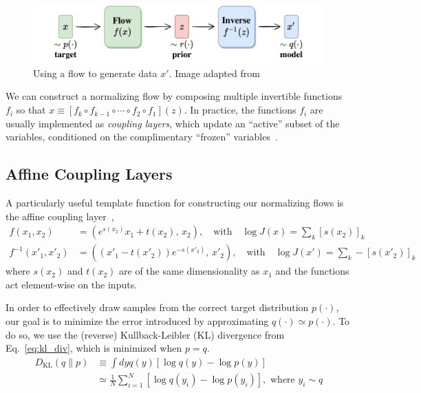 \documentclass[a4paper,11pt]{article}
\begin{document}
\begin{figure}[htpb]
    \centering
    \includegraphics[width=\textwidth]{assets/flow_model.pdf}
    \caption{\label{fig:flow_model} Using a flow to generate data \(x'\). Image
    adapted from~\cite{weng2018flow}}
\end{figure}
%
We can construct a normalizing flow by composing multiple invertible functions
\(f_{i}\) so that \(x\equiv \left[f_{k}\circ f_{k-1}\circ \cdots \circ
f_{2}\circ f_{1}\right](z)\).
%
In practice, the functions \(f_{i}\) are usually implemented as \emph{coupling
layers}, which update an ``active'' subset of the variables, conditioned on the
complimentary ``frozen'' variables~\cite{Kanwar:2020xzo,Albergo:2021vyo}.
%
\subsection{\label{subsec:coupling_layers}Affine Coupling Layers}
A particularly useful template function for constructing our normalizing flows
is the affine coupling layer~\cite{DinhSB16,rezende2015variational},
%
\begin{align*}
    f(x_{1}, x_{2}) &= \left(e^{s(x_2)}x_{1} + t(x_{2}),\, x_{2}\right),
        \quad\text{with}\quad \log J(x) = \sum_{k}\left[s(x_{2})\right]_{k}\\
    f^{-1}(x'_{1}, x'_{2}) &= \left((x'_{1}-t(x'_{2}))e^{-s(x'_{2})},\, x'_{2}\right),
        \quad\text{with}\quad \log J(x') = \sum_{k}-\left[s(x'_{2})\right]_{k}
\end{align*}
%
where \(s(x_{2})\) and \(t(x_{2})\) are of the same dimensionality as \(x_{1}\)
and the functions act element-wise on the inputs.

In order to effectively draw samples from the correct target distribution
\(p(\cdot)\), our goal is to minimize the error introduced by approximating
\(q(\cdot)\simeq p(\cdot)\).
%
To do so, we use the (reverse) Kullback-Leibler (KL) divergence from
Eq.~\ref{eq:kl_div}, which is minimized when \(p=q\).
%
\begin{align}
    \label{eq:kl_div}
    D_{\mathrm{KL}}(q\|p) 
    &\equiv\int dy q(y)\left[\log q(y) - \log p(y)\right]\\
    &\simeq \frac{1}{N}\sum_{i=1}^{N} \left[\log q(y_{i})-\log p(y_{i})\right],
        \,\,\text{where}\,\, y_{i}\sim q
\end{align}
%
\end{document}
